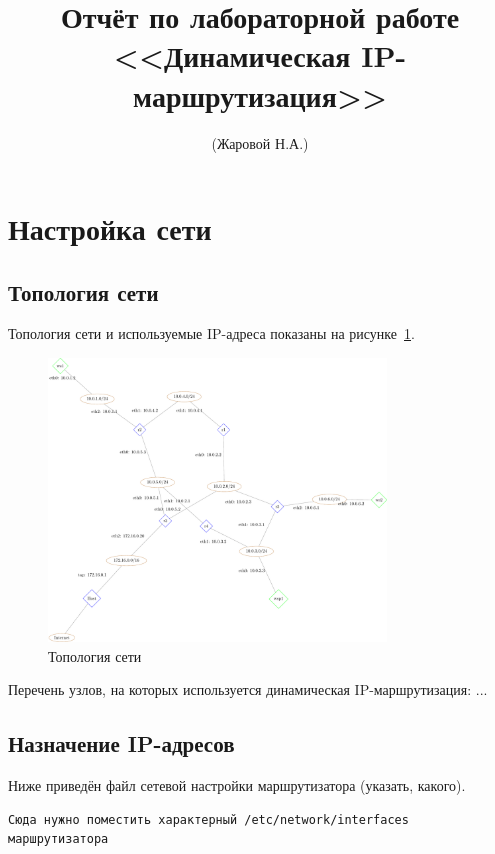 \documentclass[a4paper,12pt]{article}
\title{Отчёт по лабораторной работе \\ <<Динамическая IP-маршрутизация>>}
\author{(Жаровой Н.А.)}
\begin{document}
\maketitle

\tableofcontents

\section{Настройка сети}

\subsection{Топология сети}

Топология сети и используемые IP-адреса показаны на рисунке~\ref{fig:network}.

\begin{figure}
\centering
\includegraphics[width=0.8\textwidth]{includes/network_gv.pdf}
\caption{Топология сети}
\label{fig:network}
\end{figure}

Перечень узлов, на которых используется динамическая IP-маршрутизация: ...


\subsection{Назначение IP-адресов}

Ниже приведён файл сетевой настройки  маршрутизатора (указать, какого).

\begin{Verbatim}
Сюда нужно поместить характерный /etc/network/interfaces маршрутизатора
\end{Verbatim}
\end{document}
